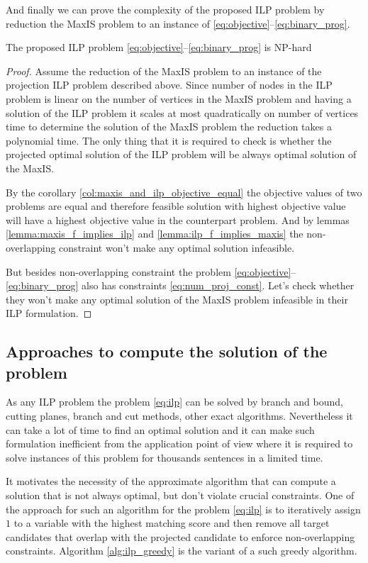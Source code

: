 And finally we can prove the complexity of the proposed ILP problem by reduction the MaxIS problem
to an instance of \eqref{eq:objective}--\eqref{eq:binary_prog}.
\begin{theorem}
    The proposed ILP problem \eqref{eq:objective}--\eqref{eq:binary_prog} is NP-hard
\end{theorem}
\begin{proof}
    Assume the reduction of the MaxIS problem to an instance of the projection ILP problem described above.
    Since number of nodes in the ILP problem is linear on the number of vertices in the MaxIS problem and
    having a solution of the ILP problem it scales at most quadratically on number of vertices time to
    determine the solution of the MaxIS problem the reduction takes a polynomial time.
    The only thing that it is required to check is whether the projected optimal solution of the ILP problem
    will be always optimal solution of the MaxIS.

    By the corollary \ref{col:maxis_and_ilp_objective_equal} the objective values of two problems are equal and therefore
    feasible solution with highest objective value will have a highest objective value in the counterpart problem.
    And by lemmas \ref{lemma:maxis_f_implies_ilp} and \ref{lemma:ilp_f_implies_maxis} the non-overlapping constraint
    won't make any optimal solution infeasible.

    But besides non-overlapping constraint the problem \eqref{eq:objective}--\eqref{eq:binary_prog} also has
    constraints \eqref{eq:num_proj_const}. Let's check whether they won't make any optimal solution of the MaxIS
    problem infeasible in their ILP formulation.

\end{proof}


\subsection{Approaches to compute the solution of the problem}
As any ILP problem the problem \eqref{eq:ilp} can be solved by branch and bound, cutting planes,
branch and cut methods, other exact algorithms. Nevertheless it can take a lot of time to find an optimal solution and
it can make such formulation inefficient from the application point of view where it is required to
solve instances of this problem for thousands sentences in a limited time.

It motivates the necessity of the approximate algorithm that can compute a solution that is not always
optimal, but don't violate crucial constraints. One of the approach for such an algorithm for the problem
\eqref{eq:ilp} is to iteratively assign \( 1 \) to a variable with the highest matching score and then remove
all target candidates that overlap with the projected candidate to enforce non-overlapping constraints.
Algorithm \ref{alg:ilp_greedy} is the variant of a such greedy algorithm.

